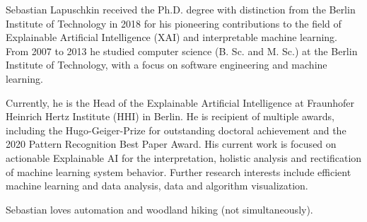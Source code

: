 \documentclass[10pt,a4paper]{article} %
\begin{document}
\spacedhrule{0.9em}{-0.4em} %



\vspace{-1.3em} %

\begin{multicols}{2}  %
\noindent

Sebastian Lapuschkin received the Ph.D. degree with distinction from the Berlin Institute of Technology in 2018
for his pioneering contributions to the field of Explainable Artificial Intelligence (XAI) and interpretable machine learning.
From 2007 to 2013 he studied computer science (B. Sc. and M. Sc.) at the Berlin Institute of Technology,
with a focus on software engineering and machine learning.

Currently, he is the Head of the Explainable Artificial Intelligence at Fraunhofer Heinrich Hertz Institute (HHI) in Berlin.
He is recipient of multiple awards, including the Hugo-Geiger-Prize for outstanding doctoral achievement and the 2020 Pattern Recognition Best Paper Award.
His current work is focused on actionable Explainable AI for the interpretation, holistic analysis and rectification of machine learning system behavior.
Further research interests include efficient machine learning and data analysis, data and algorithm visualization.

Sebastian loves automation and woodland hiking (not simultaneously).

\end{multicols}

\spacedhrule{0.5em}{-0.4em} %




\end{document}
